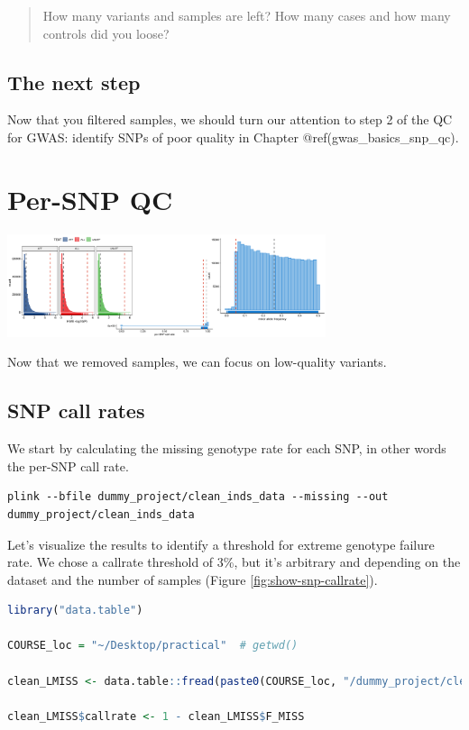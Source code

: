 \documentclass[
]{book}
\begin{document}
\begin{quote}
How many variants and samples are left? How many cases and how many controls did you loose?
\end{quote}

\hypertarget{the-next-step}{%
\section{The next step}\label{the-next-step}}

Now that you filtered samples, we should turn our attention to step 2 of the QC for GWAS: identify SNPs of poor quality in Chapter @ref(gwas\_basics\_snp\_qc).

\hypertarget{gwas_basics_snp_qc}{%
\chapter{Per-SNP QC}\label{gwas_basics_snp_qc}}

\includegraphics[width=0.7\textwidth,height=\textheight]{./img/_gwas_dummy/gwas_snp_qc.png}

Now that we removed samples, we can focus on low-quality variants.

\hypertarget{snp-call-rates}{%
\section{SNP call rates}\label{snp-call-rates}}

We start by calculating the missing genotype rate for each SNP, in other words the per-SNP call rate.

\begin{lstlisting}
plink --bfile dummy_project/clean_inds_data --missing --out dummy_project/clean_inds_data
\end{lstlisting}

Let's visualize the results to identify a threshold for extreme genotype failure rate. We chose a callrate threshold of 3\%, but it's arbitrary and depending on the dataset and the number of samples (Figure \ref{fig:show-snp-callrate}).

\begin{lstlisting}[language=R]
library("data.table")

COURSE_loc = "~/Desktop/practical"  # getwd()

clean_LMISS <- data.table::fread(paste0(COURSE_loc, "/dummy_project/clean_inds_data.lmiss"))

clean_LMISS$callrate <- 1 - clean_LMISS$F_MISS
\end{lstlisting}
\end{document}
